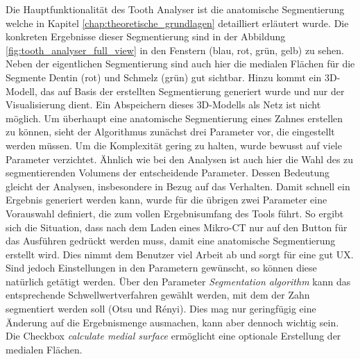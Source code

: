 Die Hauptfunktionalität des Tooth Analyser ist die anatomische Segmentierung
welche in Kapitel \ref{chap:theoretische_grundlagen} detailliert erläutert wurde.
Die konkreten Ergebnisse dieser Segmentierung sind in der Abbildung \ref{fig:tooth_analyser_full_view}
in den Fenstern (blau, rot, grün, gelb) zu sehen. Neben der eigentlichen Segmentierung
sind auch hier die medialen Flächen für die Segmente Dentin (rot) und Schmelz (grün)
gut sichtbar. Hinzu kommt ein \ac{3D}-Modell, das auf Basis der erstellten
Segmentierung generiert wurde und nur der Visualisierung dient. Ein Abspeichern dieses
\ac{3D}-Modells als Netz ist nicht möglich. Um überhaupt eine anatomische Segmentierung
eines Zahnes erstellen zu können, sieht der Algorithmus zunächst drei Parameter
vor, die eingestellt werden müssen. Um die Komplexität gering zu halten, wurde bewusst
auf viele Parameter verzichtet. Ähnlich wie bei den Analysen ist auch hier die
Wahl des zu segmentierenden Volumens der entscheidende Parameter. Dessen Bedeutung
gleicht der Analysen, insbesondere in Bezug auf das Verhalten. Damit schnell ein
Ergebnis generiert werden kann, wurde für die übrigen zwei Parameter eine
Vorauswahl definiert, die zum vollen Ergebnisumfang des Tools führt. So ergibt
sich die Situation, dass nach dem Laden eines Mikro-\ac{CT} nur auf den Button
für das Ausführen gedrückt werden muss, damit eine anatomische Segmentierung erstellt
wird. Dies nimmt dem Benutzer viel Arbeit ab und sorgt für eine gut \ac{UX}.
Sind jedoch Einstellungen in den Parametern gewünscht, so können diese natürlich
getätigt werden. Über den Parameter \textit{Segmentation algorithm} kann das entsprechende
Schwellwertverfahren gewählt werden, mit dem der Zahn segmentiert werden soll (Otsu
und Rényi). Dies mag nur geringfügig eine Änderung auf die Ergebnismenge ausmachen,
kann aber dennoch wichtig sein. Die Checkbox \textit{calculate medial surface}
ermöglicht eine optionale Erstellung der medialen Flächen.

